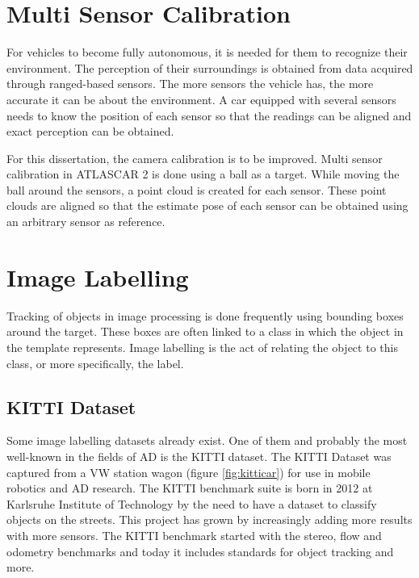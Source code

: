 \section{Multi Sensor Calibration}

For vehicles to become fully autonomous, it is needed for them to recognize their environment. The perception of their surroundings is obtained from data acquired through ranged-based sensors. The more sensors the vehicle has, the more accurate it can be about the environment. A car equipped with several sensors needs to know the position of each sensor so that the readings can be aligned and exact perception can be obtained. 

For this dissertation, the camera calibration is to be improved. Multi sensor calibration in ATLASCAR 2 is done using a ball as a target. While moving the ball around the sensors, a point cloud is created for each sensor. These point clouds are aligned so that the estimate pose of each sensor can be obtained using an arbitrary sensor as reference. \cite{VieiradaSilva2016}

\section{Image Labelling}
Tracking of objects in image processing is done frequently using bounding boxes around the target. These boxes are often linked to a class in which the object in the template represents. Image labelling is the act of relating the object to this class, or more specifically, the label. 

\subsection{KITTI Dataset}
Some image labelling datasets already exist. One of them and probably the most well-known in the fields of AD is the KITTI dataset. \cite{KarlsruheInstituteofTechnology} The KITTI Dataset was captured from a VW station wagon (figure \ref{fig:kitticar}) for use in mobile robotics and AD research. The KITTI benchmark suite is born in 2012 at Karlsruhe Institute of Technology by the need to have a dataset to classify objects on the streets. This project has grown by increasingly adding more results with more sensors. The KITTI benchmark started with the stereo, flow and odometry benchmarks and today it includes standards for object tracking and more. 


